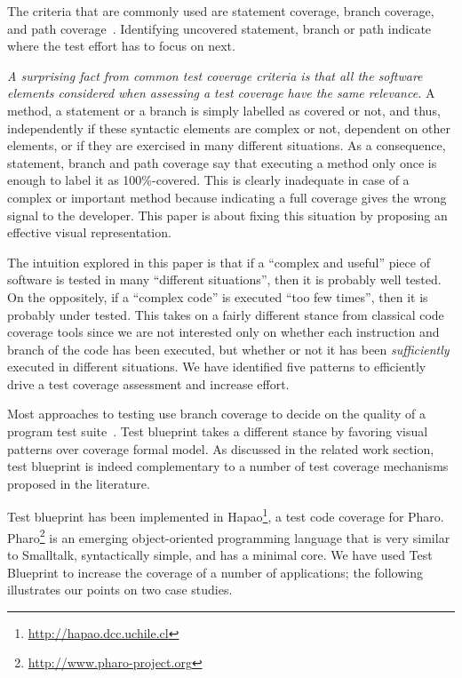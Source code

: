 \documentclass{sig-alternate}
\newcommand{\hapao}{Hapao\xspace}
\begin{document}
The criteria that are commonly used are statement coverage, branch coverage, and path coverage~\cite{Hong97a}. 
Identifying uncovered statement, branch or path indicate where the test effort has to focus on next.

\textit{A surprising fact from common test coverage criteria is that all the software elements considered when assessing a test coverage have the same relevance.} A method, a statement or a branch is simply labelled as covered or not, and thus, independently if these syntactic elements are complex or not, dependent on other elements, or if they are exercised in many different situations.
As a consequence, statement, branch and path coverage say that executing a method only once is enough to label it as 100\%-covered. This is clearly inadequate in case of a complex or important method because indicating a full coverage gives the wrong signal to the developer.
This paper is about fixing this situation by proposing an effective visual representation.

The intuition explored in this paper is that if a ``complex and useful'' piece of software is tested in many ``different situations'', then it is probably well tested. On the oppositely, if a ``complex code'' is executed ``too few times'', then it is probably under tested. This takes on a fairly different stance from classical code coverage tools since we are not interested only on whether each instruction and branch of the code has been executed, but whether or not it has been \emph{sufficiently} executed in different situations. We have identified five patterns to efficiently drive a test coverage assessment and increase effort.

Most approaches to testing use branch coverage to decide on the quality of a program test suite~\cite{Hong97a}.
Test blueprint takes a different stance by favoring visual patterns over coverage formal model. 
As discussed in the related work section, test blueprint is indeed complementary to a number of test coverage mechanisms proposed in the literature. 

Test blueprint has been implemented in \hapao\footnote{\url{http://hapao.dcc.uchile.cl}}, a test code coverage for Pharo. Pharo\footnote{\url{http://www.pharo-project.org}} is an emerging object-oriented programming language that is very similar to Smalltalk, syntactically simple, and has a minimal core. We have used Test Blueprint to increase the coverage of a number of applications; the following illustrates our points on two case studies.
\end{document}
